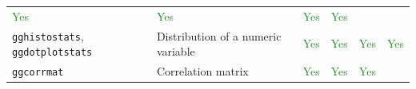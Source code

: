 \documentclass[
]{article}
\begin{document}
\begin{longtable}[]{@{}llllll@{}}
\begin{minipage}[t]{0.08\columnwidth}
\textcolor{ForestGreen}{Yes}\strut
\end{minipage} & \begin{minipage}[t]{0.10\columnwidth}\raggedright
\textcolor{ForestGreen}{Yes}\strut
\end{minipage} & \begin{minipage}[t]{0.08\columnwidth}\raggedright
\textcolor{ForestGreen}{Yes}\strut
\end{minipage} & \begin{minipage}[t]{0.10\columnwidth}\raggedright
\textcolor{ForestGreen}{Yes}\strut
\end{minipage}\tabularnewline
\begin{minipage}[t]{0.14\columnwidth}\raggedright
\texttt{gghistostats}, \texttt{ggdotplotstats}\strut
\end{minipage} & \begin{minipage}[t]{0.35\columnwidth}\raggedright
Distribution of a numeric variable\strut
\end{minipage} & \begin{minipage}[t]{0.08\columnwidth}\raggedright
\textcolor{ForestGreen}{Yes}\strut
\end{minipage} & \begin{minipage}[t]{0.10\columnwidth}\raggedright
\textcolor{ForestGreen}{Yes}\strut
\end{minipage} & \begin{minipage}[t]{0.08\columnwidth}\raggedright
\textcolor{ForestGreen}{Yes}\strut
\end{minipage} & \begin{minipage}[t]{0.10\columnwidth}\raggedright
\textcolor{ForestGreen}{Yes}\strut
\end{minipage}\tabularnewline
\begin{minipage}[t]{0.14\columnwidth}\raggedright
\texttt{ggcorrmat}\strut
\end{minipage} & \begin{minipage}[t]{0.35\columnwidth}\raggedright
Correlation matrix\strut
\end{minipage} & \begin{minipage}[t]{0.08\columnwidth}\raggedright
\textcolor{ForestGreen}{Yes}\strut
\end{minipage} & \begin{minipage}[t]{0.10\columnwidth}\raggedright
\textcolor{ForestGreen}{Yes}\strut
\end{minipage} & \begin{minipage}[t]{0.08\columnwidth}\raggedright
\textcolor{ForestGreen}{Yes}\strut

\end{minipage}
\end{longtable}
\end{document}
